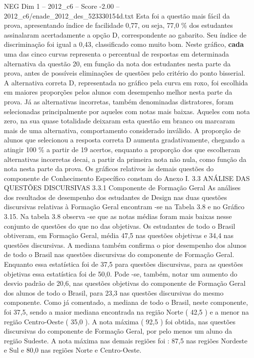 \begin{textsample}{NEG Dim 1 – 2012\_c6 – Score -2.00 – 2012\_c6/enade\_2012\_des\_523330154d.txt}
Esta foi a questão mais fácil da prova, apresentando índice de facilidade 0,77, ou seja, 77,0 \% dos estudantes assinalaram acertadamente a opção D, correspondente ao gabarito.
Seu índice de discriminação foi igual a 0,43, classificado como muito bom.
Neste gráfico, \textbf{cada} uma das cinco curvas representa o percentual de respostas em determinada alternativa da questão 20, em função da nota dos estudantes nesta parte da prova, antes de possíveis eliminações de questões pelo critério do ponto bisserial.
A alternativa correta D, representada no gráfico pela curva em roxo, foi escolhida em maiores proporções pelos alunos com desempenho melhor nesta parte da prova.
Já as alternativas incorretas, também denominadas distratores, foram selecionadas principalmente por aqueles com notas mais baixas.
Aqueles com nota zero, na sua quase totalidade deixaram esta questão em branco ou marcaram mais de uma alternativa, comportamento considerado inválido.
A proporção de alunos que selecionou a resposta correta D aumenta gradativamente, chegando a atingir 100 \% a partir de 19 acertos, enquanto a proporção dos que escolheram alternativas incorretas decai, a partir da primeira nota não nula, como função da nota nesta parte da prova.
Os gráficos relativos às demais questões do componente de Conhecimento Específico constam do Anexo I. 3.3 ANÁLISE DAS QUESTÕES DISCURSIVAS 3.3.1 Componente de Formação Geral As análises dos resultados de desempenho dos estudantes de Design nas duas questões discursivas relativas à Formação Geral encontram -se na Tabela 3.8 e no Gráfico 3.15.
Na tabela 3.8 observa -se que as notas médias foram mais baixas nesse conjunto de questões do que no das objetivas.
Os estudantes de todo o Brasil obtiveram, em Formação Geral, média 47,5 nas questões objetivas e 34,4 nas questões discursivas.
A mediana também confirma o pior desempenho dos alunos de todo o Brasil nas questões discursivas do componente de Formação Geral.
Enquanto essa estatística foi de 37,5 para questões discursivas, para as questões objetivas essa estatística foi de 50,0.
Pode -se, também, notar um aumento do desvio padrão de 20,6, nas questões objetivas do componente de Formação Geral dos alunos de todo o Brasil, para 23,3 nas questões discursivas do mesmo componente.
Como já comentado, a mediana de todo o Brasil, neste componente, foi 37,5, sendo a maior mediana encontrada na região Norte ( 42,5 ) e a menor na região Centro-Oeste ( 35,0 ).
A nota máxima ( 92,5 ) foi obtida, nas questões discursivas do componente de Formação Geral, por pelo menos um aluno da região Sudeste.
A nota máxima nas demais regiões foi : 87,5 nas regiões Nordeste e Sul e 80,0 nas regiões Norte e Centro-Oeste.

\end{textsample}
